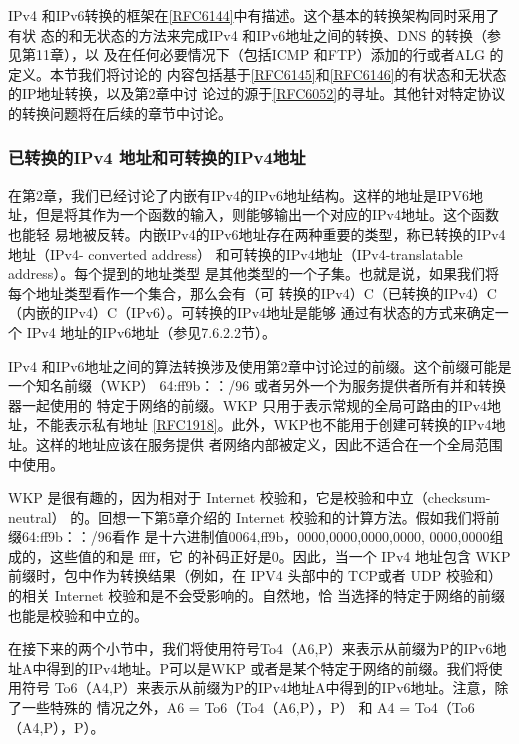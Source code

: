 IPv4
和IPv6转换的框架在\href{https://www.rfc-editor.org/rfc/rfc6144}{[RFC6144]}中有描述。这个基本的转换架构同时采用了有状
态的和无状态的方法来完成IPv4 和IPv6地址之间的转换、DNS 的转换（参见第11章），以
及在任何必要情况下（包括ICMP 和FTP）添加的行或者ALG 的定义。本节我们将讨论的
内容包括基于\href{https://www.rfc-editor.org/rfc/rfc6145}{[RFC6145]}和\href{https://www.rfc-editor.org/rfc/rfc6146}{[RFC6146]}的有状态和无状态的IP地址转换，以及第2章中讨
论过的源于\href{https://www.rfc-editor.org/rfc/rfc6052}{[RFC6052]}的寻址。其他针对特定协议的转换问题将在后续的章节中讨论。

\subsubsection{已转换的IPv4 地址和可转换的IPv4地址}

在第2章，我们已经讨论了内嵌有IPv4的IPv6地址结构。这样的地址是IPV6地
址，但是将其作为一个函数的输入，则能够输出一个对应的IPv4地址。这个函数也能轻
易地被反转。内嵌IPv4的IPv6地址存在两种重要的类型，称已转换的IPv4地址（IPv4-
converted address） 和可转换的IPv4地址（IPv4-translatable address）。每个提到的地址类型
是其他类型的一个子集。也就是说，如果我们将每个地址类型看作一个集合，那么会有（可
转换的IPv4）C（已转换的IPv4）C（内嵌的IPv4）C（IPv6）。可转换的IPv4地址是能够
通过有状态的方式来确定一个 IPv4 地址的IPv6地址（参见7.6.2.2节）。

IPv4 和IPv6地址之间的算法转换涉及使用第2章中讨论过的前缀。这个前缀可能是
一个知名前缀（WKP） 64:ff9b：：/96 或者另外一个为服务提供者所有并和转换器一起使用的
特定于网络的前缀。WKP 只用于表示常规的全局可路由的IPv4地址，不能表示私有地址
\href{https://www.rfc-editor.org/rfc/rfc1918}{[RFC1918]}。此外，WKP也不能用于创建可转换的IPv4地址。这样的地址应该在服务提供
者网络内部被定义，因此不适合在一个全局范围中使用。

WKP 是很有趣的，因为相对于 Internet 校验和，它是校验和中立（checksum-neutral）
的。回想一下第5章介绍的 Internet 校验和的计算方法。假如我们将前缀64:ff9b：：/96看作
是十六进制值0064,ff9b，0000,0000,0000,0000, 0000,0000组成的，这些值的和是 ffff，它
的补码正好是0。因此，当一个 IPv4 地址包含 WKP 前缀时，包中作为转换结果（例如，在
IPV4 头部中的 TCP或者 UDP 校验和）的相关 Internet 校验和是不会受影响的。自然地，恰
当选择的特定于网络的前缀也能是校验和中立的。

在接下来的两个小节中，我们将使用符号To4（A6,P）来表示从前缀为P的IPv6地
址A中得到的IPv4地址。P可以是WKP 或者是某个特定于网络的前缀。我们将使用符号
To6（A4,P）来表示从前缀为P的IPv4地址A中得到的IPv6地址。注意，除了一些特殊的
情况之外，A6 = To6（To4（A6,P），P） 和 A4 = To4（To6（A4,P），P）。

